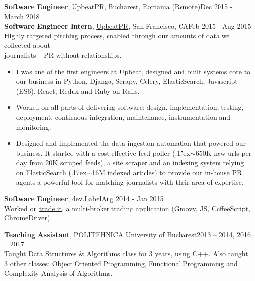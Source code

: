 \documentclass[line, margin]{resume}
\newcommand{\bettertilde}{\raise.17ex\hbox{$\scriptstyle\mathtt{\sim}$}}
\begin{document}
\begin{resume}
\textbf{Software Engineer}, \href{https://www.ycombinator.com/companies/upbeat}{UpbeatPR}, Bucharest, Romania (Remote)\hfill Dec 2015 - March 2018\\
\textbf{Software Engineer Intern}, \href{https://www.ycombinator.com/companies/upbeat}{UpbeatPR}, San Francisco, CA\hfill Feb 2015 - Aug 2015\\
Highly targeted pitching process, enabled through our amounts of data we collected about\\ journalists -- PR without relationships.
\begin{itemize} \itemsep -2pt  %
    \item I was one of the first engineers at Upbeat, designed and built systems core to our business in Python, Django, Scrapy, Celery, ElasticSearch, Javascript (ES6), React, Redux and Ruby on Rails.
    \item Worked on all parts of delivering software: design, implementation, testing, deployment, continuous integration, maintenance, instrumentation and monitoring.
    \item Designed and implemented the data ingestion automation that powered our business. It started with a cost-effective feed poller (\bettertilde650K new urls per day from 20K scraped feeds), a site scraper and an indexing system relying on ElasticSearch (\bettertilde16M indexed articles) to provide our in-house PR agents a powerful tool for matching journalists with their area of expertise.
\end{itemize}

\textbf{Software Engineer}, \href{http://devlabel.com/}{dev.Label}\hfill Aug 2014 - Jan 2015\\
Worked on \href{https://www.trade.it/}{trade.it}, a multi-broker trading application (Groovy, JS, CoffeeScript, ChromeDriver).

\textbf{Teaching Assistant}, POLITEHNICA University of Bucharest\hfill 2013 -- 2014, 2016 -- 2017\\
Taught Data Structures \& Algorithms class for 3 years, using C++. Also taught 3 other classes: Object Oriented Programming, Functional Programming and Complexity Analysis of Algorithms.


\end{resume}
\end{document}

